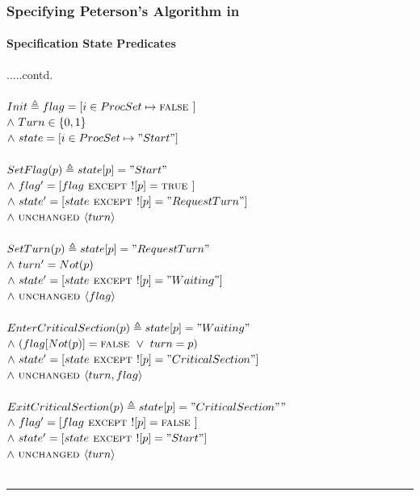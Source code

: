 \documentclass[xcolor=dvipsnames]{beamer}
\begin{document}
\begin{frame}
	\frametitle{Specifying Peterson's Algorithm in \tla}
	\framesubtitle{Specification State Predicates}
	\fontsize{7}{7.2}\selectfont
	
	.....contd. \\~\\
	$ Init \triangleq flag = [i \in ProcSet \mapsto \mbox{\textsc{false }}]$ \\
	\hspace*{0.8cm}$\land \  Turn \in \{0,1\}$\\
	\hspace*{0.8cm}$\land \  state  =  [i \in ProcSet \mapsto "Start"]$\\~\\
	$ SetFlag(p) \triangleq state[p] = "Start"$ \\
	\hspace*{0.8cm}$\land \  flag' = [flag \mbox{\textsc{ except }} ![p] = \mbox{\textsc{true }}]$\\
	\hspace*{0.8cm}$\land \   state' = [state \mbox{\textsc{ except }} ![p] = "RequestTurn"]$\\
	\hspace*{0.8cm}$\land \  \mbox{\textsc{unchanged }} \langle turn \rangle $\\~\\
	$ SetTurn(p) \triangleq state[p] = "RequestTurn"$ \\
	\hspace*{0.8cm}$\land \  turn' = Not(p)$\\
	\hspace*{0.8cm}$\land \   state' = [state \mbox{\textsc{ except }} ![p] = "Waiting"]$\\
	\hspace*{0.8cm}$\land \  \mbox{\textsc{unchanged }} \langle flag \rangle $\\~\\
	$ EnterCriticalSection(p) \triangleq state[p] = "Waiting"$ \\
	\hspace*{0.8cm}$\land \  (flag[Not(p)] = \mbox{\textsc{false }} \lor \  turn = p)$\\
	\hspace*{0.8cm}$\land \   state' = [state \mbox{\textsc{ except }} ![p] = "CriticalSection"]$\\
	\hspace*{0.8cm}$\land \  \mbox{\textsc{unchanged }} \langle turn, flag \rangle $\\~\\
	$ ExitCriticalSection(p) \triangleq state[p] = "CriticalSection""$ \\
	\hspace*{0.8cm}$\land \   flag' = [flag \mbox{\textsc{ except }} ![p] = \mbox{\textsc{false }}]$\\
	\hspace*{0.8cm}$\land \   state' = [state \mbox{\textsc{ except }} ![p] = "Start"]$\\
	\hspace*{0.8cm}$\land \  \mbox{\textsc{unchanged }} \langle turn \rangle $\\~\\
	
	\hrule
	
\end{frame}
\end{document}
